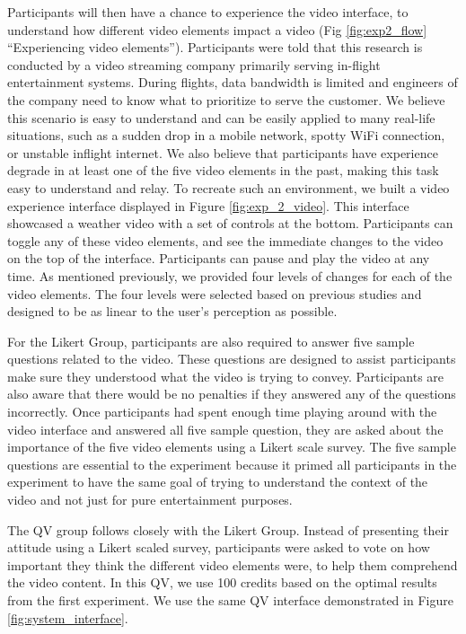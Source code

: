 Participants will then have a chance to experience the video interface, to understand how different video elements impact a video (Fig \ref{fig:exp2_flow} ``Experiencing video elements'').
Participants were told that this research is conducted by a video streaming company primarily serving in-flight entertainment systems.
During flights, data bandwidth is limited and engineers of the company need to know what to prioritize to serve the customer.
We believe this scenario is easy to understand and can be easily applied to many real-life situations, such as a sudden drop in a mobile network, spotty WiFi connection, or unstable inflight internet.
We also believe that participants have experience degrade in at least one of the five video elements in the past, making this task easy to understand and relay.
To recreate such an environment, we built a video experience interface displayed in Figure \ref{fig:exp_2_video}.
This interface showcased a weather video with a set of controls at the bottom.
Participants can toggle any of these video elements, and see the immediate changes to the video on the top of the interface.
Participants can pause and play the video at any time.
As mentioned previously, we provided four levels of changes for each of the video elements. 
The four levels were selected based on previous studies and designed to be as linear to the user's perception as possible. 

For the Likert Group,
participants are also required to answer five sample questions
related to the video.
These questions are designed to assist participants
make sure they understood what the video is trying to convey.
Participants are also aware that 
there would be no penalties if they answered any of the questions incorrectly.
Once participants had spent enough time playing around with the video interface
and answered all five sample question, 
they are asked about the importance of the five video elements
using a Likert scale survey.
The five sample questions are essential to the experiment
because it primed all participants in the experiment to have the same goal of 
trying to understand the context of the video
and not just for pure entertainment purposes.

The QV group follows closely with the Likert Group.
Instead of presenting their attitude using a Likert scaled survey,
participants were asked to vote on how important they think
the different video elements were,
to help them comprehend the video content.
In this QV, we use 100 credits based on the optimal
results from the first experiment.
We use the same QV interface demonstrated in Figure \ref{fig:system_interface}.

